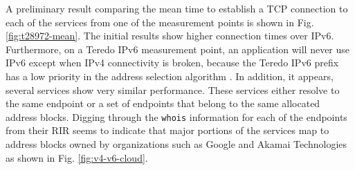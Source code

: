 A preliminary result comparing the mean time to establish a TCP connection to
each of the services from one of the measurement points is shown in Fig.
\ref{fig:t28972-mean}. The initial results show higher connection times over
IPv6. Furthermore, on a Teredo IPv6 measurement point, an application will
never use IPv6 except when IPv4 connectivity is broken, because the Teredo
IPv6 prefix has a low priority in the address selection algorithm
\cite{rfc6724}. In addition, it appears, several services show very similar
performance. These services either resolve to the same endpoint or a set of
endpoints that belong to the same allocated address blocks. Digging through
the \texttt{whois} information for each of the endpoints from their \ac{RIR}
seems to indicate that major portions of the services map to address blocks
owned by organizations such as Google and Akamai Technologies as shown in Fig.
\ref{fig:v4-v6-cloud}.
